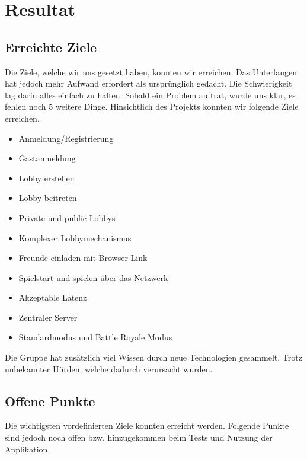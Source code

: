 \documentclass[11pt,ngerman]{article}
\begin{document}


    \section{Resultat}

    \subsection{Erreichte Ziele}
    Die Ziele, welche wir uns gesetzt haben, konnten wir erreichen. Das Unterfangen hat jedoch mehr Aufwand erfordert als ursprünglich gedacht. Die Schwierigkeit lag darin alles einfach zu halten. Sobald ein Problem auftrat, wurde uns klar, es fehlen noch 5 weitere Dinge. \newline
    \newline
    \noindent Hinsichtlich des Projekts konnten wir folgende Ziele erreichen.

	\begin{itemize}
		\item Anmeldung/Registrierung
		\item Gastanmeldung
		\item Lobby erstellen
		\item Lobby beitreten
		\item Private und public Lobbys
		\item Komplexer Lobbymechanismus
		\item Freunde einladen mit Browser-Link
		\item Spielstart und spielen über das Netzwerk
		\item Akzeptable Latenz
		\item Zentraler Server
		\item Standardmodus und Battle Royale Modus
	\end{itemize}
    Die Gruppe hat zusätzlich viel Wissen durch neue Technologien gesammelt. Trotz unbekannter Hürden, welche dadurch verursacht wurden.

    \subsection{Offene Punkte}
    Die wichtigsten vordefinierten Ziele konnten erreicht werden. Folgende Punkte sind jedoch noch offen bzw. hinzugekommen beim Tests und Nutzung der Applikation.
\end{document}

